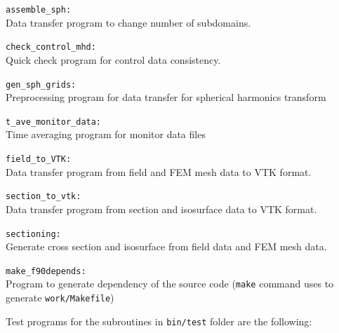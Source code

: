 \begin{description}
\item{\tt assemble\_sph:     }\\
 Data transfer program to change number of subdomains.
\item{\tt check\_control\_mhd:     }\\
 Quick check program for control data consistency.
\item{\tt gen\_sph\_grids:    }\\
 Preprocessing program for data transfer for spherical harmonics transform
\item{\tt t\_ave\_monitor\_data:     }\\
 Time averaging program for monitor data files
\item{\tt field\_to\_VTK:   }\\
 Data transfer program from field and FEM mesh data to VTK format.
\item{\tt section\_to\_vtk:     }\\
 Data transfer program from section and isosurface data to VTK format.
\item{\tt sectioning:     }\\
 Generate cross section and isosurface from field data and FEM mesh data.
\item{\tt make\_f90depends:  }\\
 Program to generate dependency of the source code ({\tt make} command uses to generate {\tt work/Makefile})
\end{description}
%
Test programs for the subroutines in  {\tt bin/test} folder are the following:
%
